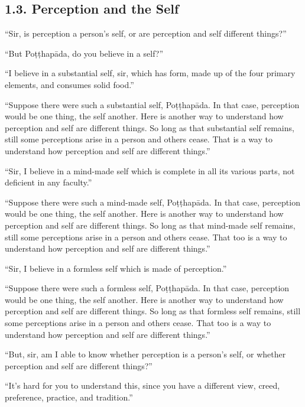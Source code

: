 \documentclass[12pt,openany]{book}%
\begin{document}
\subsection*{1.3. Perception and the Self }

“Sir, is perception a person’s self, or are perception and self different things?” 

“But \textsanskrit{Poṭṭhapāda}, do you believe in a self?” 

“I believe in a substantial self, sir, which has form, made up of the four primary elements, and consumes solid food.” 

“Suppose there were such a substantial self, \textsanskrit{Poṭṭhapāda}. In that case, perception would be one thing, the self another. Here is another way to understand how perception and self are different things. So long as that substantial self remains, still some perceptions arise in a person and others cease. That is a way to understand how perception and self are different things.” 

“Sir, I believe in a mind-made self which is complete in all its various parts, not deficient in any faculty.” 

“Suppose there were such a mind-made self, \textsanskrit{Poṭṭhapāda}. In that case, perception would be one thing, the self another. Here is another way to understand how perception and self are different things. So long as that mind-made self remains, still some perceptions arise in a person and others cease. That too is a way to understand how perception and self are different things.” 

“Sir, I believe in a formless self which is made of perception.” 

“Suppose there were such a formless self, \textsanskrit{Poṭṭhapāda}. In that case, perception would be one thing, the self another. Here is another way to understand how perception and self are different things. So long as that formless self remains, still some perceptions arise in a person and others cease. That too is a way to understand how perception and self are different things.” 

“But, sir, am I able to know whether perception is a person’s self, or whether perception and self are different things?” 

“It’s hard for you to understand this, since you have a different view, creed, preference, practice, and tradition.” 
\end{document}

